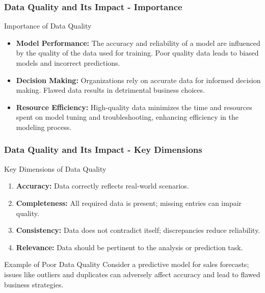 \documentclass[aspectratio=169]{beamer}
\begin{document}
\begin{frame}[fragile]
    \frametitle{Data Quality and Its Impact - Importance}
    \begin{block}{Importance of Data Quality}
        \begin{itemize}
            \item \textbf{Model Performance:} 
            The accuracy and reliability of a model are influenced by the quality of the data used for training. Poor quality data leads to biased models and incorrect predictions.
            
            \item \textbf{Decision Making:} 
            Organizations rely on accurate data for informed decision making. Flawed data results in detrimental business choices.
            
            \item \textbf{Resource Efficiency:} 
            High-quality data minimizes the time and resources spent on model tuning and troubleshooting, enhancing efficiency in the modeling process.
        \end{itemize}
    \end{block}
\end{frame}

\begin{frame}[fragile]
    \frametitle{Data Quality and Its Impact - Key Dimensions}
    \begin{block}{Key Dimensions of Data Quality}
        \begin{enumerate}
            \item \textbf{Accuracy:} Data correctly reflects real-world scenarios.
            \item \textbf{Completeness:} All required data is present; missing entries can impair quality.
            \item \textbf{Consistency:} Data does not contradict itself; discrepancies reduce reliability.
            \item \textbf{Relevance:} Data should be pertinent to the analysis or prediction task.
        \end{enumerate}
    \end{block}

    \begin{block}{Example of Poor Data Quality}
        Consider a predictive model for sales forecasts; issues like outliers and duplicates can adversely affect accuracy and lead to flawed business strategies.
    \end{block}
\end{frame}
\end{document}
